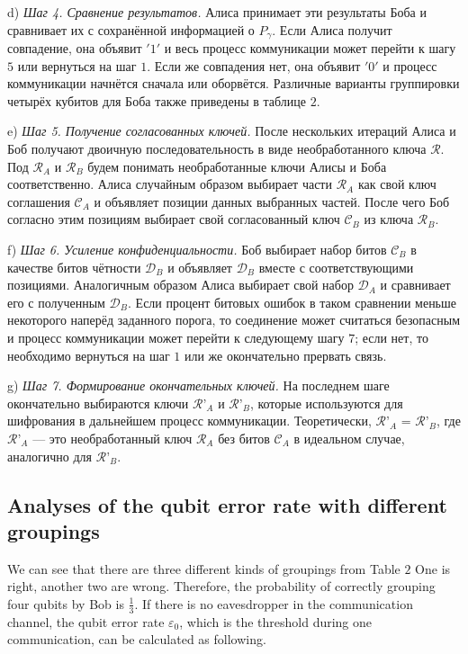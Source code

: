 \documentclass[a4paper,11pt]{article}
\begin{document}
d) \textit{Шаг 4. Сравнение результатов.} Алиса принимает эти результаты Боба и сравнивает их с сохранённой информацией о $P_\gamma$. Если Алиса получит совпадение, она объявит $'1'$ и весь процесс коммуникации может перейти к шагу $5$ или вернуться на шаг $1$. Если же совпадения нет, она объявит $'0'$ и процесс коммуникации начнётся сначала или оборвётся. Различные варианты группировки четырёх кубитов для Боба также приведены в таблице $2$.

e) \textit{Шаг 5. Получение согласованных ключей.} После нескольких итераций Алиса и Боб получают двоичную последовательность в виде необработанного ключа $\mathcal{R}$. Под $\mathcal{R}_A$ и $\mathcal{R}_B$ будем понимать необработанные ключи Алисы и Боба соответственно. Алиса случайным образом выбирает части $\mathcal{R}_A$ как свой ключ соглашения $\mathcal{C}_A$ и объявляет позиции данных выбранных частей. После чего Боб согласно этим позициям выбирает свой согласованный ключ $\mathcal{C}_B$ из ключа $\mathcal{R}_B$.

f) \textit{Шаг 6. Усиление конфиденциальности.} Боб выбирает набор битов $\mathcal{C}_B$ в качестве битов чётности $\mathcal{D}_B$ и объявляет $\mathcal{D}_B$ вместе с соответствующими позициями. Аналогичным образом Алиса выбирает свой набор $\mathcal{D}_A$ и сравнивает его с полученным $\mathcal{D}_B$. Если процент битовых ошибок в таком сравнении меньше некоторого наперёд заданного порога, то соединение может считаться безопасным и процесс коммуникации может перейти к следующему шагу $7$; если нет, то необходимо вернуться на шаг $1$ или же окончательно прервать связь.

g) \textit{Шаг 7. Формирование окончательных ключей.} На последнем шаге окончательно выбираются ключи $\mathcal{R}’_A$ и $\mathcal{R}’_B$, которые используются для шифрования в дальнейшем процесс коммуникации. Теоретически, $\mathcal{R}’_A$ = $\mathcal{R}’_B$, где $\mathcal{R}’_A$ --- это необработанный ключ $\mathcal{R}_A$ без битов $\mathcal{C}_A$ в идеальном случае, аналогично для $\mathcal{R}’_B$.

\subsection{Analyses of the qubit error rate with different groupings}

We can see that there are three different kinds of groupings from Table $2$ One is right, another two are wrong. Therefore, the probability of correctly grouping four qubits by Bob is $\frac{1}{3}$. If there is no eavesdropper in the communication channel, the qubit error rate $\varepsilon_0$, which is the threshold during one communication, can be calculated as following.
\end{document}

